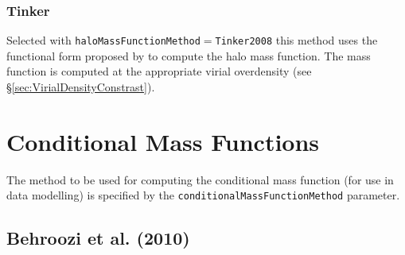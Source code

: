 \subsubsection{Tinker}

Selected with {\tt haloMassFunctionMethod}$=${\tt Tinker2008} this method uses the functional form proposed by \cite{tinker_towardhalo_2008} to compute the halo mass function. The mass function is computed at the appropriate virial overdensity (see \S\ref{sec:VirialDensityConstrast}).

\section{Conditional Mass Functions}

The method to be used for computing the conditional mass function (for use in data modelling) is specified by the {\tt conditionalMassFunctionMethod} parameter.

\subsection{Behroozi et al. (2010)}\label{phys:conditionalMassFunction:conditionalMassFunctionBehroozi2010}

